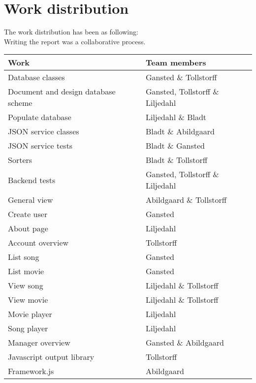 \section{Work distribution}
The work distribution has been as following:\\
Writing the report was a collaborative process.

\begin{tabular} { | p{6cm} | p{6cm} | }
\hline
\textbf{Work} & \textbf{Team members} \\
\hline
Database classes & Gansted \& Tollstorff \\
\hline
Document and design database scheme & Gansted, Tollstorff \& Liljedahl \\
\hline
Populate database & Liljedahl \& Bladt \\
\hline
JSON service classes & Bladt \& Abildgaard \\
\hline
JSON service tests & Bladt \& Gansted \\
\hline
Sorters & Bladt \& Tollstorff \\
\hline
Backend tests & Gansted, Tollstorff \& Liljedahl \\
\hline
General view & Abildgaard \& Tollstorff \\
\hline
Create user & Gansted \\
\hline
About page & Liljedahl \\
\hline
Account overview & Tollstorff \\
\hline
List song & Gansted \\
\hline
List movie & Gansted \\
\hline
View song & Liljedahl \& Tollstorff \\
\hline
View movie & Liljedahl \& Tollstorff \\
\hline
Movie player & Liljedahl \\
\hline
Song player & Liljedahl \\
\hline
Manager overview & Gansted \& Abildgaard \\
\hline
Javascript output library & Tollstorff \\
\hline
Framework.js & Abildgaard \\
\hline
\end{tabular}
